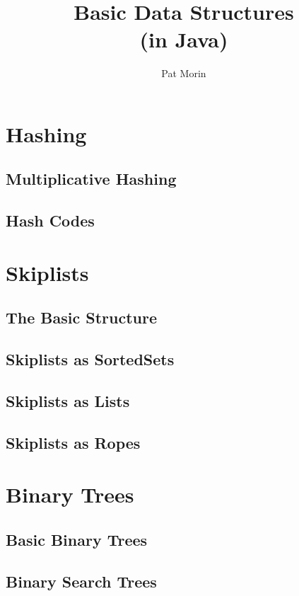 \documentclass{book}
\title{Basic Data Structures\\(in Java)}
\author{Pat Morin}
\begin{document}
\begin{titlepage}
\maketitle
\thispagestyle{empty}
\end{titlepage}

\tableofcontents





\chapter{Hashing}
\section{Multiplicative Hashing}
\section{Hash Codes}

\chapter{Skiplists}
\section{The Basic Structure}
\section{Skiplists as SortedSets}
\section{Skiplists as Lists}
\section{Skiplists as Ropes}

\chapter{Binary Trees}
\section{Basic Binary Trees}
\section{Binary Search Trees}
\end{document}
